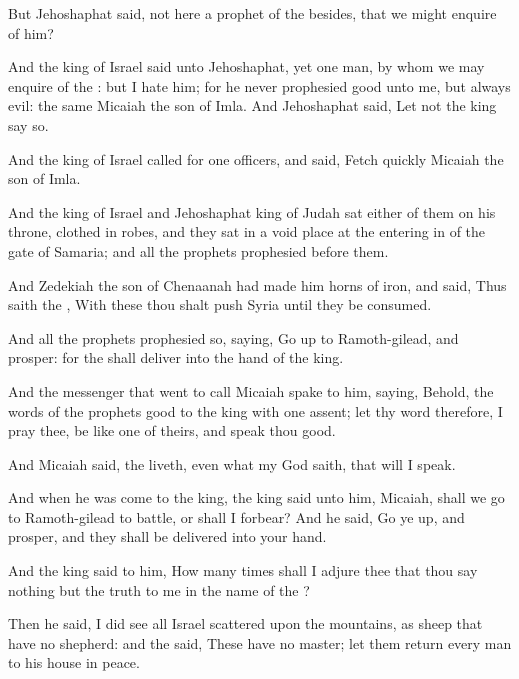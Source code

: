 {But
Jehoshaphat
said,
{} not here a
prophet of the
{} besides, that we might
enquire of him?

And the
king of
Israel
said unto
Jehoshaphat,
{} yet
one
man, by whom we may
enquire of the
{}: but I
hate him; for he never
prophesied
good unto me, but
always
evil: the same
{}
Micaiah the
son of
Imla. And
Jehoshaphat
said, Let not the
king
say so.

And the
king of
Israel
called for
one
{}
officers, and
said, Fetch
quickly
Micaiah the
son of
Imla.

And the
king of
Israel and
Jehoshaphat
king of
Judah
sat
either of them on his
throne,
clothed in
{}
robes, and they
sat in a void
place at the entering
in of the
gate of
Samaria; and all the
prophets
prophesied
before them.

And
Zedekiah the
son of
Chenaanah had
made him
horns of
iron, and
said, Thus
saith the
{}, With these thou shalt
push
Syria until they be
consumed.

And all the
prophets
prophesied so,
saying, Go
up to
Ramoth-gilead, and
prosper: for the
{} shall
deliver
{} into the
hand of the
king.

And the
messenger that
went to
call
Micaiah
spake to him,
saying, Behold, the
words of the
prophets
{}
good to the
king with
one
assent; let thy
word therefore, I pray thee, be like
one of theirs, and
speak thou
good.

And
Micaiah
said,
{} the
{}
liveth, even what my
God
saith, that will I
speak.

And when he was
come to the
king, the
king
said unto him,
Micaiah, shall we
go to
Ramoth-gilead to
battle, or shall I
forbear? And he
said, Go ye
up, and
prosper, and they shall be
delivered into your
hand.

And the
king
said to him, How many
times shall I
adjure thee that thou
say nothing but the
truth to me in the
name of the
{}?

Then he
said, I did
see all
Israel
scattered upon the
mountains, as
sheep that have no
shepherd: and the
{}
said, These have no
master; let them
return
{} every
man to his
house in
peace.

}
